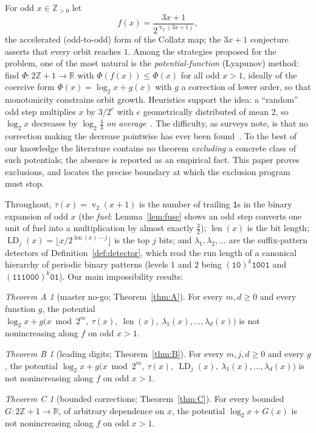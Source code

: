 \documentclass[11pt]{article}
\theoremstyle{definition}
\theoremstyle{remark}
\newtheorem*{thmA}{Theorem A}
\newtheorem*{thmB}{Theorem B}
\newtheorem*{thmC}{Theorem C}
\newcommand{\Z}{\mathbb{Z}}
\newcommand{\R}{\mathbb{R}}
\newcommand{\bitlen}{\operatorname{len}}
\newcommand{\LD}{\operatorname{LD}}
\DeclareMathOperator{\vv}{v}
\begin{document}
For odd $x\in\Z_{>0}$ let
\[
f(x)=\frac{3x+1}{2^{\vv_2(3x+1)}},
\]
the accelerated (odd-to-odd) form of the Collatz map; the $3x+1$
conjecture asserts that every orbit reaches $1$. Among the strategies
proposed for the problem, one of the most natural is the
\emph{potential-function} (Lyapunov) method: find
$\Phi:2\Z+1\to\R$ with $\Phi(f(x))\le\Phi(x)$ for all odd $x>1$,
ideally of the coercive form $\Phi(x)=\log_2x+g(x)$ with $g$ a
correction of lower order, so that monotonicity constrains orbit
growth. Heuristics support the idea: a ``random'' odd step multiplies
$x$ by $3/2^{e}$ with $e$ geometrically distributed of mean $2$, so
$\log_2x$ decreases by $\log_2\frac43$ \emph{on
average}~\cite{Lagarias1985}. The difficulty, as surveys note, is that
no correction making the decrease pointwise has ever been
found~\cite{Lagarias2010}. To the best of our knowledge the literature
contains no theorem \emph{excluding} a concrete class of such
potentials; the absence is reported as an empirical fact. This paper
proves exclusions, and locates the precise boundary at which the
exclusion program must stop.

Throughout, $\tau(x)=\vv_2(x+1)$ is the number of trailing
\texttt{1}s in the binary expansion of odd $x$ (the \emph{fuel}:
Lemma~\ref{lem:fuse} shows an odd step converts one unit of fuel into a
multiplication by almost exactly $\tfrac32$); $\bitlen(x)$ is the bit
length; $\LD_j(x)=\lfloor x/2^{\bitlen(x)-j}\rfloor$ is the top $j$
bits; and $\lambda_1,\lambda_2,\dots$ are the suffix-pattern detectors
of Definition~\ref{def:detector}, which read the run length of a
canonical hierarchy of periodic binary patterns (levels $1$ and $2$
being $(\texttt{10})^{k}\texttt{1001}$ and
$(\texttt{111000})^{k}\texttt{01}$). Our main impossibility results:

\begin{thmA}[master no-go; Theorem~\ref{thm:A}]
For every $m,d\ge0$ and every function $g$, the potential
$\log_2x+g\bigl(x\bmod2^m,\ \tau(x),\ \bitlen(x),\
\lambda_1(x),\dots,\lambda_d(x)\bigr)$ is not nonincreasing along $f$
on odd $x>1$.
\end{thmA}

\begin{thmB}[leading digits; Theorem~\ref{thm:B}]
For every $m,j,d\ge0$ and every $g$, the potential
$\log_2x+g\bigl(x\bmod2^m,\ \tau(x),\ \LD_j(x),\
\lambda_1(x),\dots,\lambda_d(x)\bigr)$ is not nonincreasing along $f$
on odd $x>1$.
\end{thmB}

\begin{thmC}[bounded corrections; Theorem~\ref{thm:C}]
For every bounded $G:2\Z+1\to\R$, of arbitrary dependence on $x$, the
potential $\log_2x+G(x)$ is not nonincreasing along $f$ on odd $x>1$.
\end{thmC}
\end{document}
